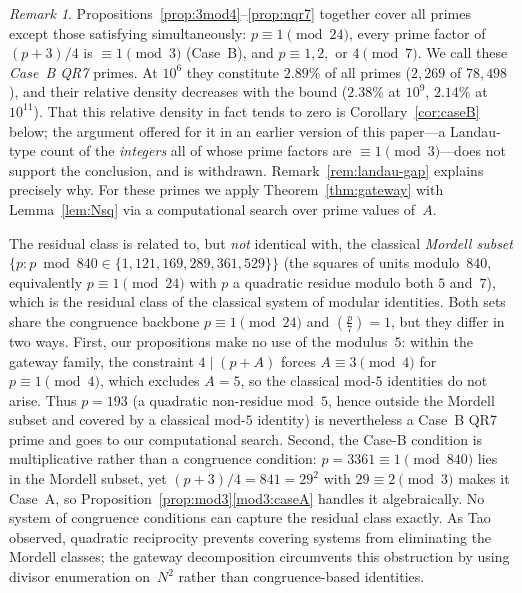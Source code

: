 \documentclass[12pt]{amsart}
\theoremstyle{definition}
\theoremstyle{remark}
\newtheorem{remark}[theorem]{Remark}
\newcommand{\legendre}[2]{\left(\frac{#1}{#2}\right)}
\begin{document}
\begin{remark}\label{rem:coverage}
Propositions~\ref{prop:3mod4}--\ref{prop:nqr7} together cover all primes
except those satisfying simultaneously:
$p \equiv 1 \pmod{24}$,
every prime factor of $(p+3)/4$ is $\equiv 1 \pmod{3}$ (Case~B), and
$p \equiv 1, 2,$ or $4 \pmod{7}$.
We call these \emph{Case~B QR7} primes.
At $10^6$ they constitute $2.89\%$ of all primes ($2{,}269$ of
$78{,}498$), and their relative density decreases with the bound
($2.38\%$ at $10^9$, $2.14\%$ at $10^{11}$).
That this relative density in fact tends to zero is
Corollary~\ref{cor:caseB} below; the argument offered for it in an
earlier version of this paper---a Landau-type count of the
\emph{integers} all of whose prime factors are $\equiv 1 \pmod 3$---does
not support the conclusion, and is withdrawn.
Remark~\ref{rem:landau-gap} explains precisely why.
For these primes we apply Theorem~\ref{thm:gateway} with
Lemma~\ref{lem:Nsq} via a computational search over prime values of~$A$.

The residual class is related to, but \emph{not} identical with, the
classical \emph{Mordell subset}
$\{p : p \bmod 840 \in \{1, 121, 169, 289, 361, 529\}\}$
(the squares of units modulo~$840$, equivalently
$p \equiv 1 \pmod{24}$ with $p$ a quadratic residue modulo both $5$
and~$7$), which is the residual class of the classical system of
modular identities.
Both sets share the congruence backbone $p \equiv 1 \pmod{24}$ and
$\legendre{p}{7} = 1$, but they differ in two ways.
First, our propositions make no use of the modulus~$5$: within the
gateway family, the constraint $4 \mid (p+A)$ forces $A \equiv 3
\pmod 4$ for $p \equiv 1 \pmod 4$, which excludes $A = 5$, so the
classical mod-$5$ identities do not arise.
Thus $p = 193$ (a quadratic non-residue mod~$5$, hence outside the
Mordell subset and covered by a classical mod-$5$ identity) is
nevertheless a Case~B QR7 prime and goes to our computational search.
Second, the Case-B condition is multiplicative rather than a congruence
condition: $p = 3361 \equiv 1 \pmod{840}$ lies in the Mordell subset,
yet $(p+3)/4 = 841 = 29^2$ with $29 \equiv 2 \pmod 3$ makes it Case~A,
so Proposition~\ref{prop:mod3}\ref{mod3:caseA} handles it algebraically.
No system of congruence conditions can capture the residual class
exactly.
As Tao~\cite{Tao2011} observed, quadratic reciprocity prevents
covering systems from eliminating the Mordell classes; the gateway
decomposition circumvents this obstruction by using
divisor enumeration on~$N^2$ rather than congruence-based identities.
\end{remark}
\end{document}
